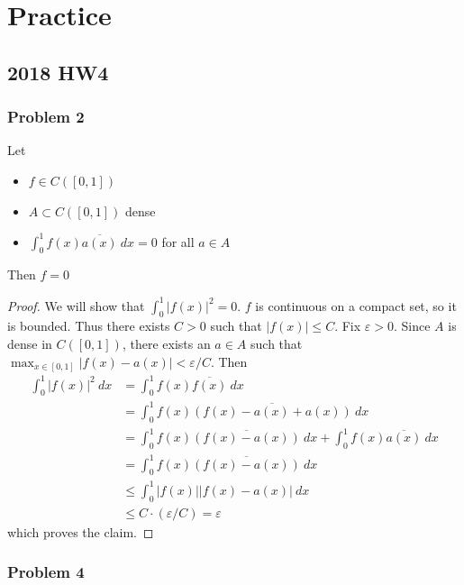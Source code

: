 \documentclass[11pt]{article}
\numberwithin{equation}{section}
\theoremstyle{definition}
\theoremstyle{definition}
\newcommand\abs[1]{\left| #1 \right|}
\def\ss{\subset}
\newcommand{\1}{\mathbbm 1}
\newcommand{\e}{\varepsilon}
\begin{document}
\section{Practice}

\subsection{2018 HW4}

\subsubsection*{Problem 2}

\begin{theorem}[]
	Let
	\begin{itemize}
		\item $f \in C([0,1])$
		\item $A \ss C([0,1])$ dense
		\item $\int_0^1 f(x) \overline{a(x)} \ dx = 0$ for all $a \in A$
	\end{itemize}
	Then $f = 0$
\end{theorem}
\begin{proof}
	We will show that $\int_0^1 \abs{f(x)}^2 = 0$. $f$ is continuous on a compact set, so it is bounded. Thus there exists $C > 0$ such that $|f(x)| \leq C$. Fix $\e > 0$. Since $A$ is dense in $C([0,1])$, there exists an $a \in A$ such that $\max_{x\in[0,1]} |f(x) - a(x)| < \e/C$. Then
	\begin{align*}
		\int_0^1 \abs{f(x)}^2 \ dx &= \int_0^1 f(x) \overline{f(x)} \ dx \\
		&= \int_0^1 f(x) \overline{(f(x) - a(x) + a(x))} \ dx \\
		&= \int_0^1 f(x) \overline{(f(x) - a(x))} \ dx + \int_0^1  f(x)\overline{a(x)} \ dx \\
		&= \int_0^1 f(x) \overline{(f(x) - a(x))} \ dx \\
		&\leq \int_0^1 |f(x)| \abs{f(x) - a(x)} \ dx \\
		&\leq C \cdot (\e/C) = \e
	\end{align*}
	which proves the claim. 
\end{proof}

\subsubsection*{Problem 4}
\end{document}
